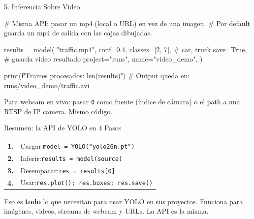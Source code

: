 \documentclass[aspectratio=169, 11pt]{beamer}
\begin{document}
\begin{frame}{5. Inferencia Sobre Video}
  \vspace{-4pt}
  \begin{pyblock}
# Misma API: pasar un mp4 (local o URL) en vez de una imagen.
# Por default guarda un mp4 de salida con las cajas dibujadas.

results = model(
    "traffic.mp4",
    conf=0.4,
    classes=[2, 7],         # car, truck
    save=True,              # guarda video resultado
    project="runs", name="video_demo",
)

print(f"Frames procesados: {len(results)}")
# Output queda en: runs/video_demo/traffic.avi
  \end{pyblock}

  \vspace{4pt}
  {\scriptsize\color{textMuted}
    \faLightbulb\hspace{4pt} Para webcam en vivo: pasar \texttt{0} como
    fuente (\'indice de c\'amara) o el path a una RTSP de IP camera.
    Mismo c\'odigo.}
\end{frame}

\begin{frame}[shrink]{Resumen: la API de YOLO en 4 Pasos}
  \vspace{14pt}
  {\footnotesize\color{arcaDark}\bfseries\centering
  \begin{tabular}{@{}rl@{}}
    \textbf{1.} & Cargar:\quad     \texttt{model = YOLO("yolo26n.pt")} \\[6pt]
    \textbf{2.} & Inferir:\quad    \texttt{results = model(source)} \\[6pt]
    \textbf{3.} & Desempacar:\quad \texttt{res = results[0]} \\[6pt]
    \textbf{4.} & Usar:\quad       \texttt{res.plot(); res.boxes; res.save()}
  \end{tabular}
  }

  \vspace{14pt}
  {\footnotesize
    Eso es \textbf{todo} lo que necesitan para usar YOLO en sus proyectos.
    Funciona para im\'agenes, videos, streams de webcam y URLs. La API es
    la misma.}
\end{frame}
\end{document}
